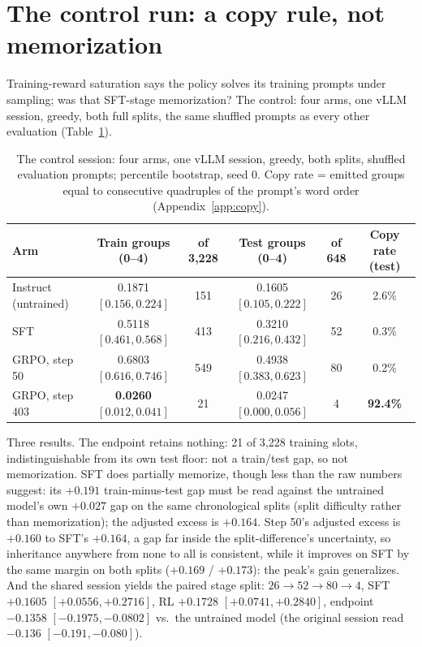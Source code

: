 \documentclass{article}
\begin{document}
\section{The control run: a copy rule, not memorization}
\label{sec:control}

Training-reward saturation says the policy solves its training prompts
under sampling; was that SFT-stage memorization? The control: four arms, one vLLM session, greedy, both full splits, the same shuffled prompts as every other evaluation (Table~\ref{tab:control}).

\begin{table}[t]
\centering
\caption{The control session: four arms, one vLLM session, greedy, both
splits, shuffled evaluation prompts; percentile bootstrap, seed 0. Copy
rate = emitted groups equal to consecutive quadruples of the prompt's word
order (Appendix~\ref{app:copy}).}
\label{tab:control}
\footnotesize
\setlength{\tabcolsep}{4pt}
\begin{tabular}{lccccc}
\toprule
Arm & Train groups (0--4) & of 3{,}228 & Test groups (0--4) & of 648 & Copy rate (test) \\
\midrule
Instruct (untrained) & 0.1871 $[0.156, 0.224]$ & 151 & 0.1605 $[0.105, 0.222]$ & 26 & 2.6\% \\
SFT & 0.5118 $[0.461, 0.568]$ & 413 & 0.3210 $[0.216, 0.432]$ & 52 & 0.3\% \\
GRPO, step 50 & 0.6803 $[0.616, 0.746]$ & 549 & 0.4938 $[0.383, 0.623]$ & 80 & 0.2\% \\
GRPO, step 403 & \textbf{0.0260} $[0.012, 0.041]$ & 21 & 0.0247 $[0.000, 0.056]$ & 4 & \textbf{92.4\%} \\
\bottomrule
\end{tabular}
\end{table}

Three results. The endpoint retains nothing: 21 of 3{,}228 training
slots, indistinguishable from its own test floor: not a train/test gap, so
not memorization. SFT does partially memorize, though less than the raw
numbers suggest: its $+0.191$ train-minus-test gap must be read against the untrained model's own $+0.027$ gap on the same chronological splits (split difficulty rather than memorization); the adjusted excess is $+0.164$. Step 50's adjusted excess is $+0.160$ to SFT's $+0.164$, a gap far inside the split-difference's uncertainty, so inheritance anywhere from none to all is consistent, while it improves on SFT by the same margin on both splits ($+0.169$ / $+0.173$): the peak's gain generalizes. And the shared session yields the
paired stage split: $26 \rightarrow 52 \rightarrow 80 \rightarrow 4$, SFT $+0.1605$ $[+0.0556, +0.2716]$, RL $+0.1728$
$[+0.0741, +0.2840]$, endpoint $-0.1358$ $[-0.1975, -0.0802]$ vs.\ the
untrained model (the original session read $-0.136$ $[-0.191, -0.080]$).
\end{document}
